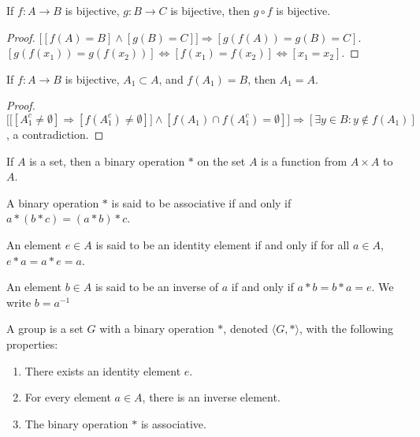 \documentclass[crop=false,class=article,oneside]{standalone}
\begin{document}
        \begin{theorem}
        If $f:A\rightarrow B$ is bijective, $g:B\rightarrow C$ is bijective, then $g\circ f$ is bijective.
        \end{theorem}
        \begin{proof}
        $\big[[f(A) = B]\land [g(B) = C]\big]\Rightarrow [g(f(A)) = g(B) = C]$. $[g(f(x_1))=g(f(x_2))]\Leftrightarrow [f(x_1)=f(x_2)]\Leftrightarrow [x_1=x_2]$.
        \end{proof}
        \begin{theorem}
        If $f:A\rightarrow B$ is bijective, $A_1\subset A$, and $f(A_1) = B$, then $A_1=A$.
        \end{theorem}
        \begin{proof}
        $\Big[\big[[A_1^c \ne \emptyset]\Rightarrow [f(A_1^c) \ne \emptyset]\big]\land[f(A_1)\cap f(A_1^c) = \emptyset]\Big]\Rightarrow [\exists y\in B:y\notin f(A_1)]$, a contradiction.
        \end{proof}
        \begin{definition}
        If $A$ is a set, then a binary operation $*$ on the set $A$ is a function from $A\times A$ to $A$.
        \end{definition}
        \begin{definition}
        A binary operation $*$ is said to be associative if and only if $a*(b*c) = (a*b)*c$.
        \end{definition}
        \begin{definition}
        An element $e\in A$ is said to be an identity element if and only if for all $a\in A$, $e*a = a*e = a$.
        \end{definition}
        \begin{definition}
        An element $b\in A$ is said to be an inverse of $a$ if and only if $a*b=b*a = e$. We write $b=a^{-1}$
        \end{definition}
        \begin{definition}[Group]
        A group is a set $G$ with a binary operation $*$, denoted $\langle G,* \rangle$, with the following properties: 
        \begin{enumerate}
        \item There exists an identity element $e$.
        \item For every element $a\in A$, there is an inverse element.
        \item The binary operation $*$ is associative.
        \end{enumerate}
        \end{definition}
\end{document}
